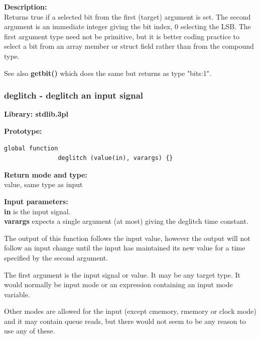             {\bf Description:} \\
            Returns true if a selected bit from the first (target) argument is
            set. The second argument is an immediate integer giving the bit
            index, 0 selecting the LSB. The first argument type need not be
            primitive, but it is better coding practice to select a bit from an
            array member or struct field rather than from the compound type.
            
            See also {\bf getbit()}  which does the same
            but returns as type "bits:1".
            





        \subsubsection{deglitch - deglitch an input signal}\label{sec:lfdeglitch}

            {\bf Library: stdlib.3pl}

            {\bf Prototype:} \\
            \vsp
            \begin{lstlisting}[gobble=12, language=threepl]
               global function
               deglitch (value(in), varargs) {}
            \end{lstlisting}

            {\bf Return mode and type:} \\
            value, same type as input

            {\bf Input parameters:} \\            
            {\bf in} is the input signal. \\
            {\bf varargs} expects a single argument (at most) giving the
            deglitch time constant.
            
            The output of this function follows the input value, however
            the output will not follow an input change until the input
            has maintained its new value for a time specified by the
            second argument.
            
            The first argument is the input signal or value. It may be any
            target type. It would normally be input mode or an expression
            containing an input mode variable.
            
            Other modes are allowed for the input (except cmemory, rmemory or
            clock mode) and it may contain queue reads, but there would not seem
            to be any reason to use any of these.
            
